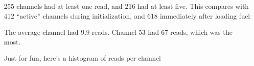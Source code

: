 255 channels had at least one read, and 216 had at least five.  
This compares with 412 ``active'' channels during initialization, and 618 immediately after loading fuel

The average channel had 9.9 reads. 
Channel 53 had 67 reads, which was the most.

Just for fun, here's a histogram of reads per channel\\
